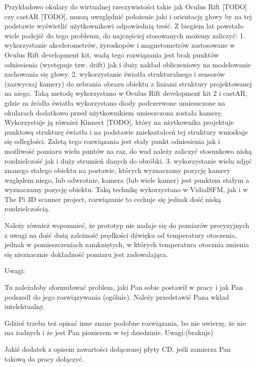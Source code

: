 Przykładowo okulary do wirtualnej rzeczywistości takie jak Oculus Rift [TODO] czy castAR [TODO],
muszą uwzględnić położenie jaki i orientację głowy by na tej podstawie wyświetlić użytkownikowi 
odpowiednią treść. 
Z biegiem lat powstało wiele podejść do tego problemu, do najczęściej stosowanych możemy zaliczyć:
1. wykorzystanie akcelerometrów, żyroskopów i magnetometrów zastosowane w Oculus Rift development kit,
wadą tego rozwiązania jest brak punktów odniesienia (występuje tzw. drift) jak i duży nakład obliczeniowy na
modelowanie zachowania się głowy.
2. wykorzystanie światła strukturalnego i sensorów (zazwyczaj kamery)
 do zebrania obrazu obiektu z liniami struktury projektowanej na niego. Taką metodę wykorzystano w 
 Oculus Rift development kit 2 i castAR, gdzie za źródła światła wykorzystano diody podczerwone umieszczone 
 na okularach dodatkowo przed użytkownikiem umieszczona została kamerę. Wykorzystuje ją również Kinnect [TODO],
który na użytkownika projektuje punktową strukturę światła i na podstawie zniekształceń tej struktury wnioskuje 
 się odległości. Zaletą tego rozwiązania jest stały punkt odniesienia jak i możliwość pomiaru wielu puntów na raz,
 do wad należy zaliczyć stosunkowo niską rozdzielczość jak i duży strumień danych do obróbki.
3. wykorzystanie wielu zdjęć znanego stałego obiektu na postawie, których wyznaczamy pozycję kamery względem niego,
  lub odwrotnie, kamera (lub wiele kamer) jest punktem stałym a wyznaczamy pozycję obiektu.  
 Taką technikę wykorzystano w VidialSFM, jak i w The Pi 3D scanner project, 
 rozwiązanie to cechuje się jednak dość niską rozdzielczością.
 



Należy również wspomnieć, że prototyp nie nadaje się do pomiarów precyzyjnych 
z uwagi na 
dość dużą zależność prędkości dźwięku od temperatury otoczenia,
jednak w pomieszczeniach zamkniętych, w których temperatura otocznia zmienia się nieznacznie
dokładność pomiaru jest zadowalająca.


\newpage
Uwagi: 

Tu należałoby sformułować problem, jaki Pan sobie postawił w pracy i jak Pan podszedł do jego rozwiązywania (ogólnie). 
Należy przedstawić Pana wkład intelektualny.

Gdzieś trzeba też opisać inne znane podobne rozwiązania, bo nie uwierzę, że nie ma żadnych i że jest Pan pionierem w tej dziedzinie.
\newline
Uwagi:(brakuje)

Jakiś dodatek z opisem zawartości dołączonej płyty CD, jeśli zamierza Pan takową do pracy dołączyć.
   